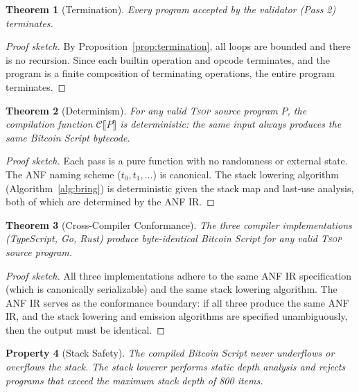 \documentclass[11pt,a4paper]{article}
\newtheorem{theorem}{Theorem}[section]
\newtheorem{property}[theorem]{Property}
\newcommand{\tsop}{\textsc{Tsop}}
\newcommand{\compile}[1]{\mathcal{C}\llbracket #1 \rrbracket}
\begin{document}
\begin{theorem}[Termination]
\label{thm:termination}
Every program accepted by the validator (Pass 2) terminates.
\end{theorem}

\begin{proof}[Proof sketch]
By Proposition~\ref{prop:termination}, all loops are bounded and there is
no recursion. Since each builtin operation and opcode terminates, and the
program is a finite composition of terminating operations, the entire
program terminates.
\end{proof}

\begin{theorem}[Determinism]
\label{thm:determinism}
For any valid \tsop{} source program $P$, the compilation function
$\compile{P}$ is deterministic: the same input always produces the same
Bitcoin Script bytecode.
\end{theorem}

\begin{proof}[Proof sketch]
Each pass is a pure function with no randomness or external state. The
ANF naming scheme ($t_0, t_1, \ldots$) is canonical. The stack lowering
algorithm (Algorithm~\ref{alg:bring}) is deterministic given the stack
map and last-use analysis, both of which are determined by the ANF IR.
\end{proof}

\begin{theorem}[Cross-Compiler Conformance]
\label{thm:conformance}
The three compiler implementations (TypeScript, Go, Rust) produce
byte-identical Bitcoin Script for any valid \tsop{} source program.
\end{theorem}

\begin{proof}[Proof sketch]
All three implementations adhere to the same ANF IR specification (which
is canonically serializable) and the same stack lowering algorithm. The
ANF IR serves as the conformance boundary: if all three produce the same
ANF IR, and the stack lowering and emission algorithms are specified
unambiguously, then the output must be identical.
\end{proof}

\begin{property}[Stack Safety]
\label{prop:stack-safety}
The compiled Bitcoin Script never underflows or overflows the stack.
The stack lowerer performs static depth analysis and rejects programs that
exceed the maximum stack depth of 800 items.
\end{property}
\end{document}
